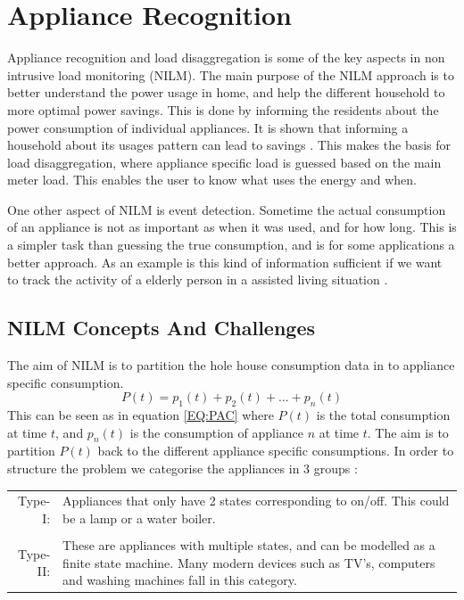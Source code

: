 \chapter{Appliance Recognition }

Appliance recognition and load disaggregation is some of the key aspects in non intrusive load monitoring (NILM). The main purpose of the NILM approach is to better understand the power usage in home, and help the different household to more optimal power savings. This is done by informing the residents about the power consumption of individual appliances. It is shown that informing a household about its usages pattern can lead to savings . This makes the basis for load disaggregation, where appliance specific load is guessed based on the main meter load. This enables the user to know what uses the energy and when.

One other aspect of NILM is event detection. Sometime the actual consumption of an appliance is not as important as when it was used, and for how long. This is a simpler task than guessing the true consumption, and is for some applications a better approach. As an example is this kind of information sufficient if we want to track the activity of a elderly person in a assisted living situation . 

\section{NILM Concepts And Challenges} 
The aim of NILM is to partition the hole house consumption data in to appliance specific consumption. 
\begin{equation}
	P(t) = p_1(t) + p_2(t) + ... + p_n(t)
	\label{EQ:PAC}
\end{equation}
This can be seen as in equation \ref{EQ:PAC} where $P(t)$ is the total consumption at time $t$, and $p_n(t)$ is the consumption of appliance $n$ at time $t$. The aim is to partition $P(t)$ back to the different appliance specific consumptions. In order to structure the problem we categorise the appliances in 3 groups : 

\begin{tabularx}{\linewidth}{ r X }
Type-I:&Appliances that only have 2 states corresponding to on/off. This could be a lamp or a water boiler. \\
\\
Type-II:&These are appliances with multiple states, and can be modelled as a finite state machine. Many modern devices such as TV's, computers and washing machines fall in this category.   \\
\end{tabularx}

